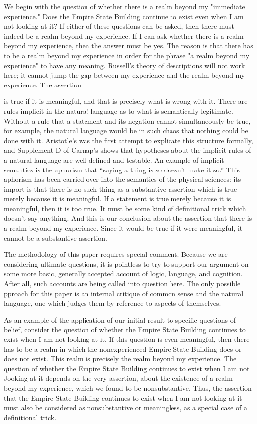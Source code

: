 \documentclass[10pt,twoside,draft]{memoir}
\newcommand{\speech}[1]{
	\textquote{\emph{#1}}}
\begin{document}
We begin with the question of whether there is a realm beyond my 
"immediate experience." Does the Empire State Building continue to exist 
even when I am not looking at it? If either of these questions can be asked, 
then there must indeed be a realm beyond my experience. If I can ask 
whether there is a realm beyond my experience, then the answer must be 
yes. The reason is that there has to be a realm beyond my experience in 
order for the phrase "a realm beyond my experience" to have any meaning. 
Russell's theory of descriptions will not work here; it cannot jump the gap 
between my experience and the realm beyond my experience. The assertion 
\speech{There is a realm beyond my experience} is true if it is meaningful, and that 
is precisely what is wrong with it. There are rules implicit in the natura! 
language as to what is semantically legitimate. Without a rule that a 
statement and its negation cannot simultaneously be true, for example, the 
natural language would be in such chaos that nothing could be done with it. 
Aristotle's  was the first attempt to explicate this structure formally, 
and Supplement D of Carnap's  shows that hypotheses 
about the implicit rules of a natural language are well-defined and testable. 
An example of implicit semantics is the aphorism that \enquote{saying a thing is so 
doesn't make it so.} This aphorism has been carried over into the semantics 
of the physical sciences: its import is that there is no such thing as a 
substantive assertion which is true merely because it is meaningful. If a 
statement is true merely because it is meaningful, then it is too true. It must 
be some kind of definitional trick which doesn't say anything. And this is 
our conclusion about the assertion that there is a realm beyond my 
experience. Since it would be true if it were meaningful, it cannot be a 
substantive assertion. 

The methodology of this paper requires special comment. Because we 
are considering ultimate questions, it is pointless to try to support our 
argument on some more basic, generally accepted account of logic, language, 
and cognition. After all, such accounts are being called into question here. 
The only possible pproach for this paper is an internal critique of common 
sense and the natural language, one which judges them by reference to 
aspects of themselves. 

As an example of the application of our initial result to specific 
questions of belief, consider the question of whether the Empire State 
Building continues to exist when I am not looking at it. If this question is 
even meaningful, then there has to be a realm in which the nonexperienced 
Empire State Building does or does not exist. This realm is precisely the 
realm beyond my experience. The question of whether the Empire State 
Building continues to exist when I am not Jooking at it depends on the very 
assertion, about the existence of a realm beyond my experience, which we 
found to be nonsubstantive. Thus, the assertion that the Empire State 
Building continues to exist when I am not looking at it must also be 
considered as nonsubstantive or meaningless, as a special case of a 
definitional trick. 
\end{document}
